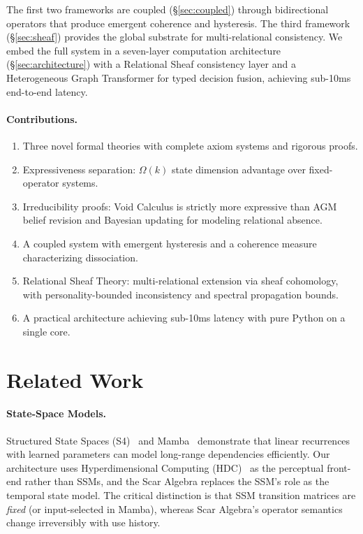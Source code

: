 \documentclass[11pt]{article}
\begin{document}
The first two frameworks are coupled (\S\ref{sec:coupled}) through bidirectional operators that produce emergent coherence and hysteresis. The third framework (\S\ref{sec:sheaf}) provides the global substrate for multi-relational consistency. We embed the full system in a seven-layer computation architecture (\S\ref{sec:architecture}) with a Relational Sheaf consistency layer and a Heterogeneous Graph Transformer for typed decision fusion, achieving sub-10ms end-to-end latency.

\paragraph{Contributions.}
\begin{enumerate}[leftmargin=*]
\item Three novel formal theories with complete axiom systems and rigorous proofs.
\item Expressiveness separation: $\Omega(k)$ state dimension advantage over fixed-operator systems.
\item Irreducibility proofs: Void Calculus is strictly more expressive than AGM belief revision and Bayesian updating for modeling relational absence.
\item A coupled system with emergent hysteresis and a coherence measure characterizing dissociation.
\item Relational Sheaf Theory: multi-relational extension via sheaf cohomology, with personality-bounded inconsistency and spectral propagation bounds.
\item A practical architecture achieving sub-10ms latency with pure Python on a single core.
\end{enumerate}

\section{Related Work}
\label{sec:related}

\paragraph{State-Space Models.}
Structured State Spaces (S4)~\cite{gu2022} and Mamba~\cite{gu2023} demonstrate that linear recurrences with learned parameters can model long-range dependencies efficiently. Our architecture uses Hyperdimensional Computing (HDC)~\cite{kanerva2009} as the perceptual front-end rather than SSMs, and the Scar Algebra replaces the SSM's role as the temporal state model. The critical distinction is that SSM transition matrices are \emph{fixed} (or input-selected in Mamba), whereas Scar Algebra's operator semantics change irreversibly with use history.
\end{document}
